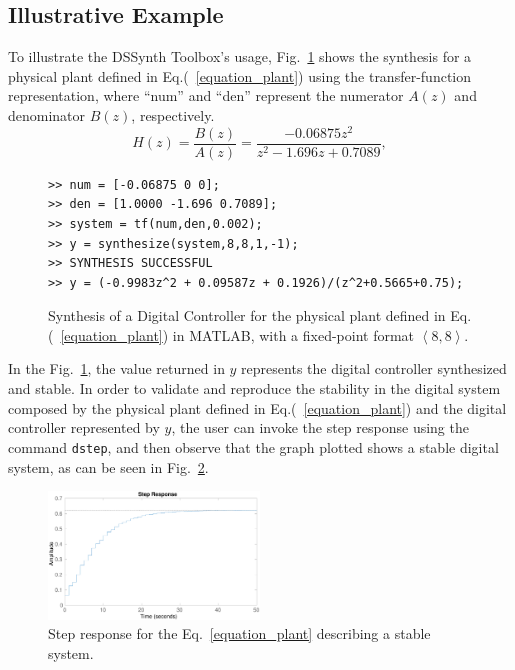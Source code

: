 \documentclass[sigconf]{acmart}
\newcommand\tool{{DSSynth Toolbox}\xspace}
\begin{document}
\subsection{Illustrative Example}

To illustrate the \tool's usage, Fig.~\ref{toolbox-usage} shows the synthesis for a physical plant defined in Eq.(~\ref{equation_plant}) using the transfer-function representation, where ``num'' and ``den'' represent the numerator $A(z)$ and denominator $B(z)$, respectively.
%
\begin{equation}
\label{equation_plant}
H(z)=\frac{B(z)}{A(z)}=\frac{-0.06875z^{2}}{z^2-1.696z+0.7089},
\end{equation}
%
\begin{figure}[ht]
\scriptsize
\begin{lstlisting}[xleftmargin=.025\textwidth,xrightmargin=.025\textwidth, frame=single,]
>> num = [-0.06875 0 0];
>> den = [1.0000 -1.696 0.7089];
>> system = tf(num,den,0.002);
>> y = synthesize(system,8,8,1,-1);
>> SYNTHESIS SUCCESSFUL
>> y = (-0.9983z^2 + 0.09587z + 0.1926)/(z^2+0.5665+0.75);
\end{lstlisting}
\vspace{-0.2cm}
\caption{Synthesis of a Digital Controller for the physical plant defined in Eq.(~\ref{equation_plant}) in MATLAB, with a fixed-point format  $\left\langle 8,8\right\rangle$.}
\label{toolbox-usage}
\end{figure}
%
In the Fig.~\ref{toolbox-usage}, the value returned in $y$ represents the digital controller synthesized and stable. In order to validate and reproduce the stability in the digital system composed by the physical plant defined in Eq.(~\ref{equation_plant}) and the digital controller represented by $y$, the user can invoke the step response using the command \texttt{dstep}, and then observe that the graph plotted shows a stable digital system, as can be seen in Fig.~\ref{step-response}.
%
\begin{figure}[ht]
  \includegraphics[width=0.5\textwidth]{step-response.eps}
  \caption{Step response for the Eq.~\eqref{equation_plant} describing a stable system.}
  \label{step-response}
\end{figure}
\end{document}

